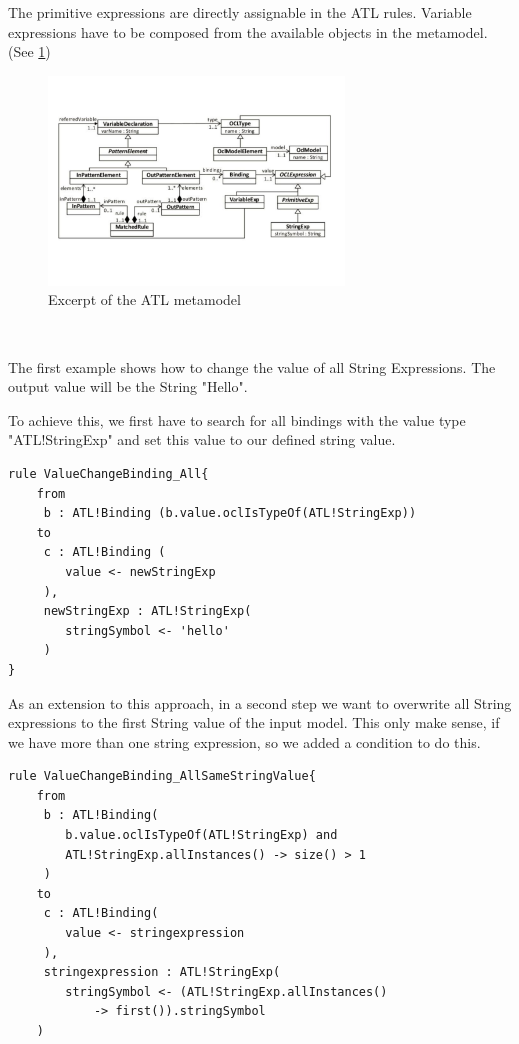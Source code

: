 \documentclass{llncs}
\begin{document}
The primitive expressions are directly assignable in the ATL rules. Variable expressions have to be composed from the available objects in the metamodel. (See \ref{fig:atl_metamodel_excerpt})

\begin{figure}
	\centering
	\includegraphics[width=0.7\textwidth,natwidth=610,natheight=642]{figures/ATL_Metamodel_Excerpt}
	\caption{Excerpt of the ATL metamodel}
	\label{fig:atl_metamodel_excerpt}
\end{figure}~

The first example shows how to change the value of all String Expressions. The output value will be the String "Hello".

To achieve this, we first have to search for all bindings with the value type "ATL!StringExp" and set this value to our defined string value.

\begin{lstlisting}
rule ValueChangeBinding_All{
	from
	 b : ATL!Binding (b.value.oclIsTypeOf(ATL!StringExp))
	to
	 c : ATL!Binding (
	 	value <- newStringExp
	 ),
	 newStringExp : ATL!StringExp(
	 	stringSymbol <- 'hello'	
	 )
}
\end{lstlisting}

As an extension to this approach, in a second step we want to overwrite all String expressions to the first String value of the input model. This only make sense, if we have more than one string expression, so we added a condition to do this.

\begin{lstlisting}
rule ValueChangeBinding_AllSameStringValue{
	from
	 b : ATL!Binding(
	 	b.value.oclIsTypeOf(ATL!StringExp) and 
		ATL!StringExp.allInstances() -> size() > 1
	 )
	to
	 c : ATL!Binding(
	 	value <- stringexpression
	 ), 
	 stringexpression : ATL!StringExp(
	 	stringSymbol <- (ATL!StringExp.allInstances() 
			-> first()).stringSymbol
	)
\end{lstlisting}
\end{document}
